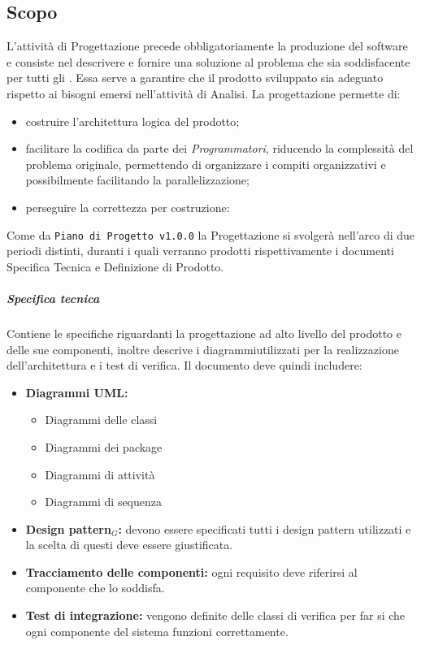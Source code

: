 \subsection{Scopo}
L'attività di Progettazione precede obbligatoriamente la produzione del software e consiste nel descrivere e fornire una soluzione al problema che sia soddisfacente per tutti gli . Essa serve a garantire che il prodotto sviluppato sia adeguato rispetto ai bisogni emersi nell'attività di Analisi. 
La progettazione permette di:
\begin{itemize}
	\item costruire l'architettura logica del prodotto;
	\item facilitare la codifica da parte dei \textit{Programmatori}, riducendo la complessità del problema originale, permettendo di organizzare i compiti organizzativi e possibilmente facilitando la parallelizzazione;
	\item perseguire la correttezza per costruzione:
\end{itemize}
Come da \texttt{Piano di Progetto v1.0.0} la Progettazione si svolgerà nell'arco di due periodi distinti, duranti i quali verranno prodotti rispettivamente i documenti Specifica Tecnica e Definizione di Prodotto.

\subparagraph{Specifica tecnica}
Contiene le specifiche riguardanti la progettazione ad alto livello del prodotto e delle sue componenti, inoltre descrive i diagrammiutilizzati per la realizzazione dell'architettura e i test di verifica. Il documento deve quindi includere:
\begin{itemize}
	\item \textbf{Diagrammi UML:}
	\begin{itemize}
		\item Diagrammi delle classi
		\item Diagrammi dei package
		\item Diagrammi di attività
		\item Diagrammi di sequenza
	\end{itemize}
	\item \textbf{Design pattern$_{G}$:} devono essere specificati tutti i design pattern utilizzati e la scelta di questi deve essere giustificata. 
	\item \textbf{Tracciamento delle componenti:} ogni requisito deve riferirsi al componente che lo soddisfa.
	\item \textbf{Test di integrazione:} vengono definite delle classi di verifica per far si che ogni componente del sistema funzioni correttamente.
\end{itemize}

